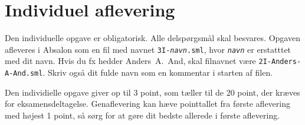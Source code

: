 \documentclass[a4paper,12pt]{article}
\begin{document}
\newpage
\section{Individuel aflevering}
\label{sec:indiv-aflev}

Den individuelle opgave er obligatorisk.  Alle delspørgsmål skal
besvares.  Opgaven afleveres i Absalon som en fil med navnet
\texttt{3I-\textit{navn}.sml}, hvor \texttt{\textit{navn}} er
erstatttet med dit navn. Hvis du fx hedder Anders~A.~And, skal
filnavnet være \texttt{2I-Anders-A-And.sml}. Skriv også dit fulde navn
som en kommentar i starten af filen.

Den individielle opgave giver op til 3 point, som tæller til de 20
point, der kræves for eksamensdeltagelse.  Genaflevering kan hæve
pointtallet fra første aflevering med højest 1 point, så sørg for at
gøre dit bedste allerede i første aflevering.
\end{document}
